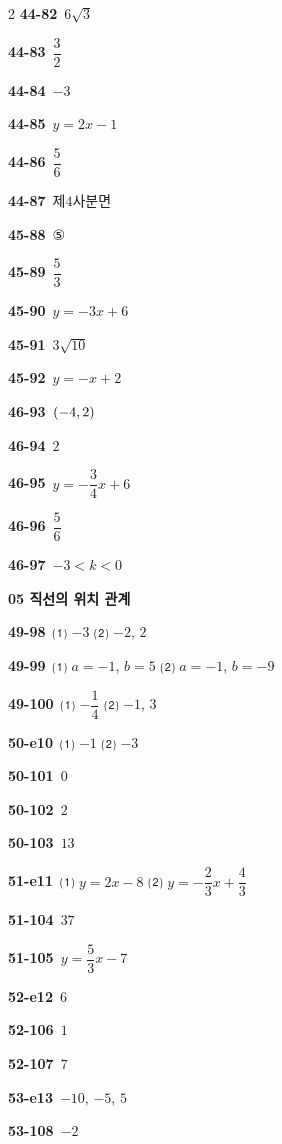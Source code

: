 \documentclass[10pt,a4paper]{article}
\begin{document}
\begin{multicols}{2}
\noindent\textbf{44-82}\ $6\sqrt{3}$\par
\noindent\textbf{44-83}\ $\dfrac{3}{2}$\par
\noindent\textbf{44-84}\ $-3$\par
\noindent\textbf{44-85}\ $y=2x-1$\par
\noindent\textbf{44-86}\ $\dfrac{5}{6}$\par
\noindent\textbf{44-87}\ 제$4$사분면\par
\noindent\textbf{45-88}\ ⑤\par
\noindent\textbf{45-89}\ $\dfrac{5}{3}$\par
\noindent\textbf{45-90}\ $y=-3x+6$\par
\noindent\textbf{45-91}\ $3\sqrt{10}$\par
\noindent\textbf{45-92}\ $y=-x+2$\par
\noindent\textbf{46-93}\ $(-4{,}\mkern3mu\mathopen{}2)$\par
\noindent\textbf{46-94}\ $2$\par
\noindent\textbf{46-95}\ $y=-\dfrac{3}{4}x+6$\par
\noindent\textbf{46-96}\ $\dfrac{5}{6}$\par
\noindent\textbf{46-97}\ $-3<k<0$\par
\noindent\textbf{05 직선의 위치 관계}\par\smallskip
\noindent\textbf{49-98}\ ⑴ $-3$ ⑵ $-2$, $2$\par
\noindent\textbf{49-99}\ ⑴ $a=-1$, $b=5$ ⑵ $a=-1$, $b=-9$\par
\noindent\textbf{49-100}\ ⑴ $-\dfrac{1}{4}$ ⑵ $-1$, $3$\par
\noindent\textbf{50-e10}\ ⑴ $-1$ ⑵ $-3$\par
\noindent\textbf{50-101}\ $0$\par
\noindent\textbf{50-102}\ $2$\par
\noindent\textbf{50-103}\ $13$\par
\noindent\textbf{51-e11}\ ⑴ $y=2x-8$ ⑵ $y=-\dfrac{2}{3}x+\dfrac{4}{3}$\par
\noindent\textbf{51-104}\ $37$\par
\noindent\textbf{51-105}\ $y=\dfrac{5}{3}x-7$\par
\noindent\textbf{52-e12}\ $6$\par
\noindent\textbf{52-106}\ $1$\par
\noindent\textbf{52-107}\ $7$\par
\noindent\textbf{53-e13}\ $-10$, $-5$, $5$\par
\noindent\textbf{53-108}\ $-2$\par

\end{multicols}
\end{document}

